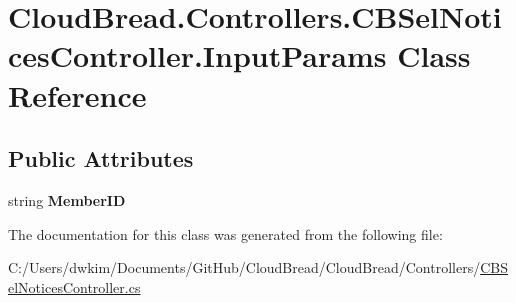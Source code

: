 \hypertarget{class_cloud_bread_1_1_controllers_1_1_c_b_sel_notices_controller_1_1_input_params}{}\section{Cloud\+Bread.\+Controllers.\+C\+B\+Sel\+Notices\+Controller.\+Input\+Params Class Reference}
\label{class_cloud_bread_1_1_controllers_1_1_c_b_sel_notices_controller_1_1_input_params}
\subsection*{Public Attributes}
\begin{DoxyCompactItemize}
\item 
string {\bfseries Member\+ID}\hypertarget{class_cloud_bread_1_1_controllers_1_1_c_b_sel_notices_controller_1_1_input_params_ac0bc4a10cd8174435a4f4065a2861c4f}{}\label{class_cloud_bread_1_1_controllers_1_1_c_b_sel_notices_controller_1_1_input_params_ac0bc4a10cd8174435a4f4065a2861c4f}

\end{DoxyCompactItemize}


The documentation for this class was generated from the following file\+:\begin{DoxyCompactItemize}
\item 
C\+:/\+Users/dwkim/\+Documents/\+Git\+Hub/\+Cloud\+Bread/\+Cloud\+Bread/\+Controllers/\hyperlink{_c_b_sel_notices_controller_8cs}{C\+B\+Sel\+Notices\+Controller.\+cs}\end{DoxyCompactItemize}
